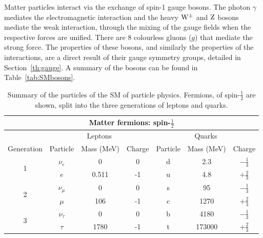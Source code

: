 Matter particles interact via the exchange of spin-1 gauge bosons. 
The photon $\gamma$ mediates the electromagnetic interaction and the heavy $\mathrm{W}^{\pm}$ and $\mathrm{Z}$ bosons mediate the weak interaction, through the mixing of the gauge fields when the respective forces are unified. There are 8 colourless gluons ($g$) that mediate the strong force.
The properties of these bosons, and similarly the properties of the interactions, are a direct result of their gauge symmetry groups, detailed in Section~\ref{th:gauge}.
A summary of the bosons can be found in Table~\ref{tab:SMbosons}.
%
%
\begin{table}[h]
\begin{tabular}{c|ccc|ccc}
\hline
\multicolumn{7}{c}{Matter fermions: spin-$\frac{1}{2}$} \\ \hline
 & \multicolumn{3}{c|}{Leptons} &\multicolumn{3}{c}{Quarks} \\ 
Generation & Particle & Mass (MeV) & Charge & Particle & Mass (MeV) & Charge \\ \hline
\multirow{2}{*}{1} & $\nu_{e}$    & 0    & 0  & d & 2.3  &$-\frac{1}{3}$\\
 				   & $e$          & 0.511& -1 & u & 4.8  &$+\frac{2}{3}$\\
\multirow{2}{*}{2} & $\nu_{\mu}$  & 0    & 0  & s & 95   &$-\frac{1}{3}$\\
 				   & $\mu$        & 106  & -1 & c & 1270 &$+\frac{2}{3}$\\
\multirow{2}{*}{3} & $\nu_{\tau}$ & 0    & 0  & b & 4180 &$-\frac{1}{3}$\\
				   & $\tau$ 	  & 1780 & -1 & t & 173000 &+$\frac{2}{3}$\\ \hline
\end{tabular}
\caption{\label{tab:SMfermions}Summary of the particles of the \ac{SM} of particle physics. Fermions, of spin-$\frac{1}{2}$ are shown, split into the three generations of leptons and quarks.}
\end{table}

